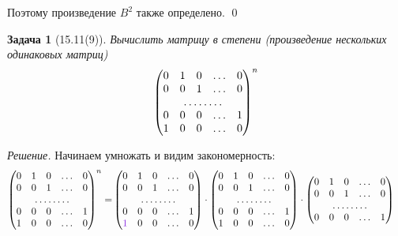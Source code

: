 \documentclass[a4paper,12pt]{article}
\newtheorem*{problem}{Задача}
\theoremstyle{definition}
\theoremstyle{remark}
\theoremstyle{remark}
\begin{document}
  Поэтому произведение $B^2$ также определено.
  \qed
  
  \begin{problem}[15.11(9)]
    Вычислить матрицу в степени (произведение нескольких одинаковых матриц)
    \[
      \begin{pmatrix}
        0 & 1 & 0 & \ldots & 0\\
        0 & 0 & 1 & \ldots & 0\\
        \hdotsfor{5}\\
        0 & 0 & 0 & \ldots & 1\\
        1 & 0 & 0 & \ldots & 0
      \end{pmatrix}^n
    \]
  \end{problem}
  
  \emph{Решение.}
  Начинаем умножать и видим закономерность:
  \begin{equation*}
  \begin{split}
    \begin{pmatrix}
      0 & 1 & 0 & \ldots & 0\\
      0 & 0 & 1 & \ldots & 0\\
      \hdotsfor{5}\\
      0 & 0 & 0 & \ldots & 1\\
      1 & 0 & 0 & \ldots & 0
    \end{pmatrix}^n
    = &\begin{pmatrix}
      0 & 1 & 0 & \ldots & 0\\
      0 & 0 & 1 & \ldots & 0\\
      \hdotsfor{5}\\
      0 & 0 & 0 & \ldots & 1\\
      \textcolor{purpleL}{1} & 0 & 0 & \ldots & 0
      \end{pmatrix}
      \cdot \begin{pmatrix}
      0 & 1 & 0 & \ldots & 0\\
      0 & 0 & 1 & \ldots & 0\\
      \hdotsfor{5}\\
      0 & 0 & 0 & \ldots & 1\\
      1 & 0 & 0 & \ldots & 0
      \end{pmatrix}
      \cdot \begin{pmatrix}
        0 & 1 & 0 & \ldots & 0\\
        0 & 0 & 1 & \ldots & 0\\
        \hdotsfor{5}\\
        0 & 0 & 0 & \ldots & 1\\

\end{pmatrix}
\end{split}
\end{equation*}
\end{document}
